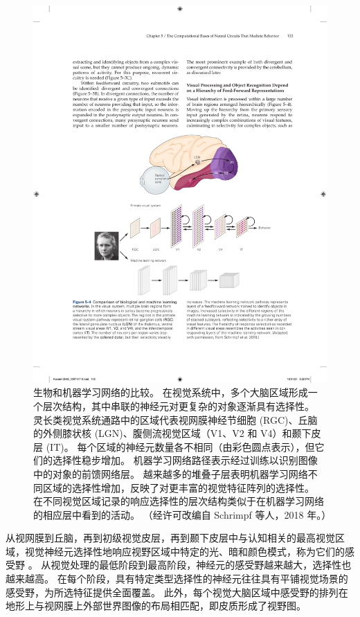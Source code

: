 \begin{figure}[htbp]
	\centering
	\includegraphics[width=1.0\linewidth]{chap05/fig_5_4}
	\caption{生物和机器学习网络的比较。 
		在视觉系统中，多个大脑区域形成一个层次结构，其中串联的神经元对更复杂的对象逐渐具有选择性。 
		灵长类视觉系统通路中的区域代表视网膜神经节细胞 (RGC)、丘脑的外侧膝状核 (LGN)、腹侧流视觉区域（V1、V2 和 V4）和颞下皮层 (IT)。
		每个区域的神经元数量各不相同（由彩色圆点表示），但它们的选择性稳步增加。 
		机器学习网络路径表示经过训练以识别图像中的对象的前馈网络层。 
		越来越多的堆叠子层表明机器学习网络不同区域的选择性增加，反映了对更丰富的视觉特征阵列的选择性。 在不同视觉区域记录的响应选择性的层次结构类似于在机器学习网络的相应层中看到的活动。 （经许可改编自 Schrimpf 等人，2018 年。）}
	\label{fig:5_4}
\end{figure}



从视网膜到丘脑，再到初级视觉皮层，再到颞下皮层中与认知相关的最高视觉区域，视觉神经元选择性地响应视野区域中特定的光、暗和颜色模式，称为它们的感受野 。
从视觉处理的最低阶段到最高阶段，神经元的感受野越来越大，选择性也越来越高。
在每个阶段，具有特定类型选择性的神经元往往具有平铺视觉场景的感受野，为所选特征提供全面覆盖。
此外，每个视觉大脑区域中感受野的排列在地形上与视网膜上外部世界图像的布局相匹配，即皮质形成了视野图。


